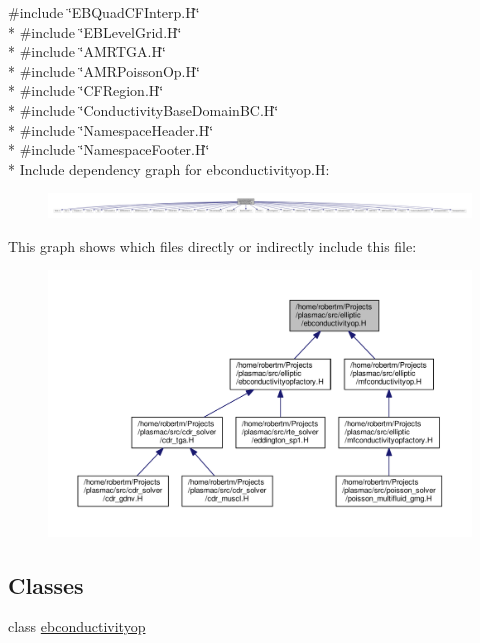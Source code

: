 {\ttfamily \#include \char`\"{}E\+B\+Quad\+C\+F\+Interp.\+H\char`\"{}}\\*
{\ttfamily \#include \char`\"{}E\+B\+Level\+Grid.\+H\char`\"{}}\\*
{\ttfamily \#include \char`\"{}A\+M\+R\+T\+G\+A.\+H\char`\"{}}\\*
{\ttfamily \#include \char`\"{}A\+M\+R\+Poisson\+Op.\+H\char`\"{}}\\*
{\ttfamily \#include \char`\"{}C\+F\+Region.\+H\char`\"{}}\\*
{\ttfamily \#include \char`\"{}Conductivity\+Base\+Domain\+B\+C.\+H\char`\"{}}\\*
{\ttfamily \#include \char`\"{}Namespace\+Header.\+H\char`\"{}}\\*
{\ttfamily \#include \char`\"{}Namespace\+Footer.\+H\char`\"{}}\\*
Include dependency graph for ebconductivityop.\+H\+:\nopagebreak
\begin{figure}[H]
\begin{center}
\leavevmode
\includegraphics[width=350pt]{ebconductivityop_8H__incl}
\end{center}
\end{figure}
This graph shows which files directly or indirectly include this file\+:\nopagebreak
\begin{figure}[H]
\begin{center}
\leavevmode
\includegraphics[width=350pt]{ebconductivityop_8H__dep__incl}
\end{center}
\end{figure}
\subsection*{Classes}
\begin{DoxyCompactItemize}
\item 
class \hyperlink{classebconductivityop}{ebconductivityop}
\end{DoxyCompactItemize}
